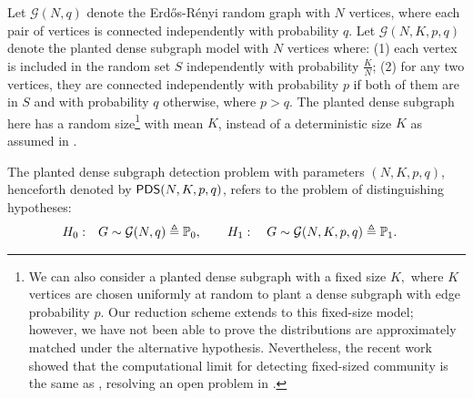 Let $\mathcal{G}(N,q)$ denote the Erd\H{o}s-R\'enyi random graph with $N$ vertices, where each pair of vertices is connected independently with probability $q$. Let $\mathcal{G}(N,K,p,q)$ denote the planted dense subgraph model with $N$ vertices where: (1) each vertex is included in the random set $S$ independently with probability $\frac{K}{N}$; (2) for any two vertices, they are connected independently with probability $p$ if both of them are in $S$ and with probability $q$ otherwise, where $p > q$. 
The planted dense subgraph here has a random size\footnote{We can also consider a planted dense subgraph with
a fixed size $K,$ where $K$ vertices are chosen uniformly at random to plant a dense subgraph with edge probability $p.$ 
Our reduction scheme extends to this fixed-size model; however, we have not been able to prove the distributions are
approximately matched under the alternative hypothesis. Nevertheless, the recent work~\cite{Brennan18} showed that the computational limit for detecting fixed-sized community is the same as , resolving an open problem in \cite{HajekWuXu14}.} with mean $K$, 
instead of a deterministic size $K$ as assumed in \cite{arias2013community,verzelen2013sparse}.
\begin{definition}\label{def:HypTesting}
The planted dense subgraph detection problem with parameters $(N,K,p,q)$, henceforth denoted by ${\sf PDS}(N,K,p,q)$, refers to the problem of distinguishing hypotheses:
 \begin{align*}
H_0: \quad & G \sim \mathcal{G}(N,q)\triangleq  \mathbb{P}_0,  \qquad H_1: \quad  G \sim \mathcal{G}(N,K,p,q) \triangleq  \mathbb{P}_1.
\end{align*}
\end{definition}



   




